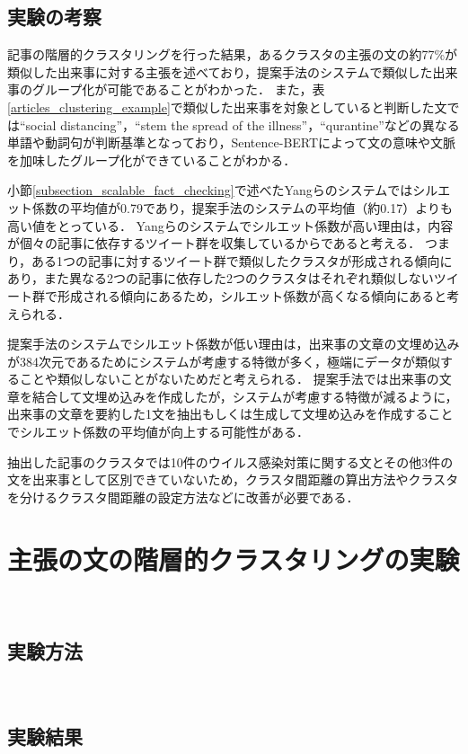 \documentclass[12pt,a4j]{jreport}
\begin{document}
\subsection{実験の考察}
記事の階層的クラスタリングを行った結果，あるクラスタの主張の文の約77\%が類似した出来事に対する主張を述べており，提案手法のシステムで類似した出来事のグループ化が可能であることがわかった．
また，表\ref{articles_clustering_example}で類似した出来事を対象としていると判断した文では``social distancing''，``stem the spread of the illness''，``qurantine''などの異なる単語や動詞句が判断基準となっており，Sentence-BERTによって文の意味や文脈を加味したグループ化ができていることがわかる．

小節\ref{subsection_scalable_fact_checking}で述べたYangらのシステムではシルエット係数の平均値が0.79であり，提案手法のシステムの平均値（約0.17）よりも高い値をとっている\cite{yang_scalable_2021}．
Yangらのシステムでシルエット係数が高い理由は，内容が個々の記事に依存するツイート群を収集しているからであると考える．
つまり，ある1つの記事に対するツイート群で類似したクラスタが形成される傾向にあり，また異なる2つの記事に依存した2つのクラスタはそれぞれ類似しないツイート群で形成される傾向にあるため，シルエット係数が高くなる傾向にあると考えられる．

提案手法のシステムでシルエット係数が低い理由は，出来事の文章の文埋め込みが384次元であるためにシステムが考慮する特徴が多く，極端にデータが類似することや類似しないことがないためだと考えられる．
提案手法では出来事の文章を結合して文埋め込みを作成したが，システムが考慮する特徴が減るように，出来事の文章を要約した1文を抽出もしくは生成して文埋め込みを作成することでシルエット係数の平均値が向上する可能性がある．

抽出した記事のクラスタでは10件のウイルス感染対策に関する文とその他3件の文を出来事として区別できていないため，クラスタ間距離の算出方法やクラスタを分けるクラスタ間距離の設定方法などに改善が必要である．

\section{主張の文の階層的クラスタリングの実験}
\label{section_sentence_clustering_experiment}
~

\subsection{実験方法}
~

\subsection{実験結果}
~
\end{document}
